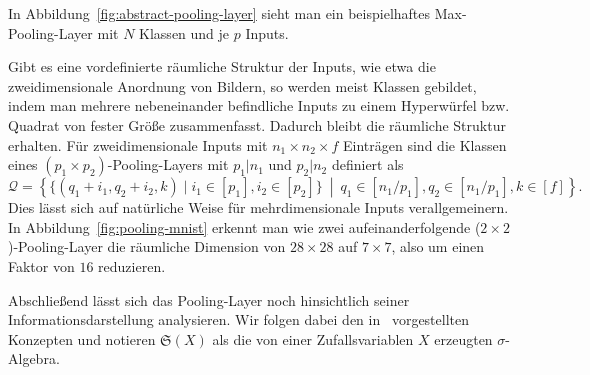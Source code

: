 \documentclass[paper=a4, 	%
		fontsize=11pt,
		abstract=true, 	%
		headsepline, 	%
		notitlepage	%
		]{scrartcl}
\theoremstyle{definition}
\newcommand{\fNat}[1]{[ #1 ]}
\newcommand{\sig}[1]{\mathfrak{S}{\left( #1 \right)}}
\begin{document}
In Abbildung~\ref{fig:abstract-pooling-layer} sieht man ein beispielhaftes Max-Pooling-Layer mit $N$ Klassen und je $p$ Inputs.

Gibt es eine vordefinierte räumliche Struktur der Inputs, wie etwa die zweidimensionale Anordnung von Bildern, so werden meist Klassen gebildet, indem man mehrere nebeneinander befindliche Inputs zu einem Hyperwürfel bzw. Quadrat von fester Größe zusammenfasst.
Dadurch bleibt die räumliche Struktur erhalten.
Für zweidimensionale Inputs mit $n_1\times n_2 \times f$ Einträgen sind die Klassen eines $(p_1\times p_2)$-Pooling-Layers mit $p_1 | n_1$ und $p_2 | n_2$ definiert als
\[
    \mathcal{Q} = \left\{
        \{ (q_1 + i_1, q_2 + i_2, k) \mid i_1\in\fNat{p_1}, i_2\in\fNat{p_2} \}
        ~\middle|~
        q_1 \in \fNat{n_1 / p_1}, q_2\in \fNat{ n_1 / p_1 }, k\in\fNat{f}
        \right\}.
\]
Dies lässt sich auf natürliche Weise für mehrdimensionale Inputs verallgemeinern.
In Abbildung~\ref{fig:pooling-mnist} erkennt man wie zwei aufeinanderfolgende ($2\times 2$)-Pooling-Layer die räumliche Dimension von $28\times 28$ auf $7\times 7$, also um einen Faktor von $16$ reduzieren.


Abschließend lässt sich das Pooling-Layer noch hinsichtlich seiner Informationsdarstellung analysieren.
Wir folgen dabei den in~\cite[Kapitel~11]{Calin2020} vorgestellten Konzepten und notieren $\sig{X}$ als die von einer Zufallsvariablen $X$ erzeugten $\sigma$-Algebra.
\end{document}
